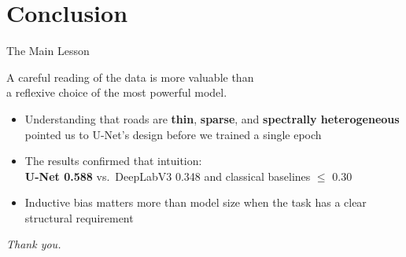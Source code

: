 \documentclass{beamer}
\begin{document}
\section{Conclusion}

\begin{frame}{The Main Lesson}
  \begin{center}
    \large
    A careful reading of the data is more valuable than\\
    a reflexive choice of the most powerful model.
  \end{center}
  \vspace{0.8em}
  \begin{itemize}
    \item Understanding that roads are \textbf{thin}, \textbf{sparse}, and \textbf{spectrally
          heterogeneous} pointed us to U-Net's design before we trained a single epoch
    \item The results confirmed that intuition: \\
          \textbf{U-Net 0.588} vs.\ DeepLabV3 0.348 and classical baselines $\leq$ 0.30
    \item Inductive bias matters more than model size when the task has a clear structural
          requirement
  \end{itemize}
  \vspace{0.5em}
  \centering
  \textit{Thank you.}
\end{frame}
\end{document}
